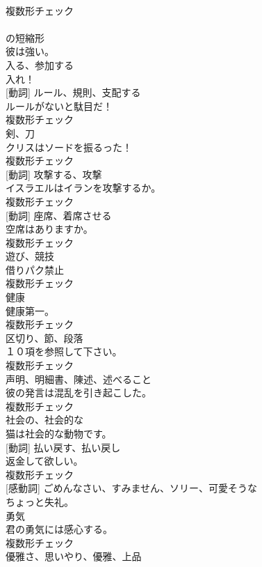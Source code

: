 \documentclass[8pt]{extreport}
\begin{document}
\begin{CJK}{UTF8}{min}
\\	複数形チェック
\\	[短縮形]	
\\	の短縮形	
\\	彼は強い。	
\\	[動詞]	入る、参加する	
\\	入れ！	
\\	[名詞] [動詞]	ルール、規則、支配する	
\\	ルールがないと駄目だ！	
\\	複数形チェック
\\	[名詞]	剣、刀	
\\	クリスはソードを振るった！	
\\	複数形チェック
\\	[名詞] [動詞]	攻撃する、攻撃	
\\	イスラエルはイランを攻撃するか。	
\\	複数形チェック
\\	[名詞] [動詞]	座席、着席させる	
\\	空席はありますか。	
\\	複数形チェック
\\	[名詞]	遊び、競技	
\\	借りパク禁止	
\\	複数形チェック
\\	[名詞]	健康	
\\	健康第一。	
\\	複数形チェック
\\	[名詞]	区切り、節、段落	
\\	１０項を参照して下さい。	
\\	複数形チェック
\\	[名詞]	声明、明細書、陳述、述べること	
\\	彼の発言は混乱を引き起こした。	
\\	複数形チェック
\\	[形容詞]	社会の、社会的な	
\\	猫は社会的な動物です。	
\\	[名詞] [動詞]	払い戻す、払い戻し	
\\	返金して欲しい。	
\\	複数形チェック
\\	[形容詞] [感動詞]	ごめんなさい、すみません、ソリー、可愛そうな	
\\	ちょっと失礼。	
\\	[名詞]	勇気	
\\	君の勇気には感心する。	
\\	複数形チェック
\\	[名詞]	優雅さ、思いやり、優雅、上品	

\end{CJK}
\end{document}
